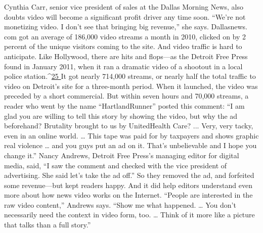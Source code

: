 Cynthia Carr, senior vice president of sales at the Dallas Morning News, also
doubts video will become a significant profit driver any time soon. ``We’re not
monetizing video. I don’t see that bringing big revenue,'' she says. Dallasnews.
com got an average of 186,000 video streams a month in 2010, clicked on by 2
percent of the unique visitors coming to the site.
And video traffic is hard to anticipate. Like Hollywood, there are hits and
flops—as the Detroit Free Press found in January 2011, when it ran a dramatic
video of a shootout in a local police station.^{\href{#endnotes-ch4}{25 }}It got nearly 714,000 streams, or
nearly half the total traffic to video on Detroit’s site for a three-month period.
When it launched, the video was preceded by a short commercial. But within
seven hours and 70,000 streams, a reader who went by the name ``HartlandRunner''
posted this comment: ``I am glad you are willing to tell this story by showing
the video, but why the ad beforehand? Brutality brought to us by UnitedHealth
Care? ... Very, very tacky, even in an online world. … This tape was paid for by
taxpayers and shows graphic real violence … and you guys put an ad on it. That’s
unbelievable and I hope you change it.''
Nancy Andrews, Detroit Free Press’s managing editor for digital media, said, ``I
saw the comment and checked with the vice president of advertising. She said
let’s take the ad off.'' So they removed the ad, and forfeited some revenue—but
kept readers happy. And it did help editors understand even more about how
news video works on the Internet. ``People are interested in the raw video content,''
Andrews says. ``Show me what happened. … You don’t necessarily need the
context in video form, too. … Think of it more like a picture that talks than a
full story.''


